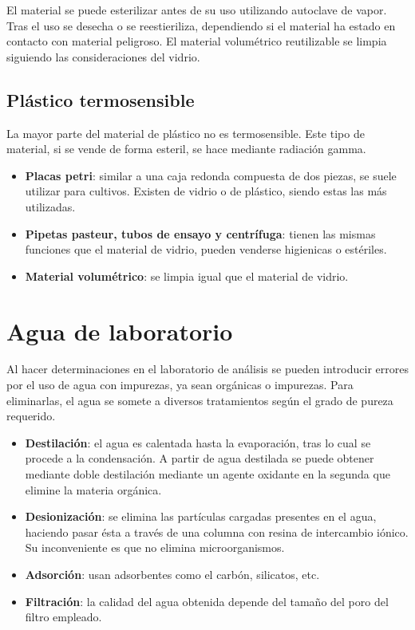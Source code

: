 El material se puede esterilizar antes de su uso utilizando autoclave de vapor. Tras el uso se desecha o se reestieriliza, dependiendo si el material ha estado en contacto con material peligroso. El material volumétrico reutilizable se limpia siguiendo las consideraciones del vidrio.
\subsection{Plástico termosensible}
La mayor parte del material de plástico no es termosensible. Este tipo de material, si se vende de forma esteril, se hace mediante radiación gamma.
\begin{itemize}[itemsep=0pt,parsep=0pt,topsep=0pt,partopsep=0pt]
    \item \textbf{Placas petri}: similar a una caja redonda compuesta de dos piezas, se suele utilizar para cultivos. Existen de vidrio o de plástico, siendo estas las más utilizadas.
    \item\textbf{Pipetas pasteur, tubos de ensayo y centrífuga}: tienen las mismas funciones que el material de vidrio, pueden venderse higienicas o estériles.
    \item\textbf{Material volumétrico}: se limpia igual que el material de vidrio.
\end{itemize}
\section{Agua de laboratorio}
Al hacer determinaciones en el laboratorio de análisis se pueden introducir errores por el uso de agua con impurezas, ya sean orgánicas o impurezas. Para eliminarlas, el agua se somete a diversos tratamientos según el grado de pureza requerido.
\begin{itemize}[itemsep=0pt,parsep=0pt,topsep=0pt,partopsep=0pt]
    \item \textbf{Destilación}: el agua es calentada hasta la evaporación, tras lo cual se procede a la condensación. A partir de agua destilada se puede obtener mediante doble destilación mediante un agente oxidante en la segunda que elimine la materia orgánica.
    \item\textbf{Desionización}: se elimina las partículas cargadas presentes en el agua, haciendo pasar ésta a través de una columna con resina de intercambio iónico. Su inconveniente es que no elimina microorganismos.
    \item\textbf{Adsorción}: usan adsorbentes como el carbón, silicatos, etc.
    \item\textbf{Filtración}: la calidad del agua obtenida depende del tamaño del poro del filtro empleado.
\end{itemize}
